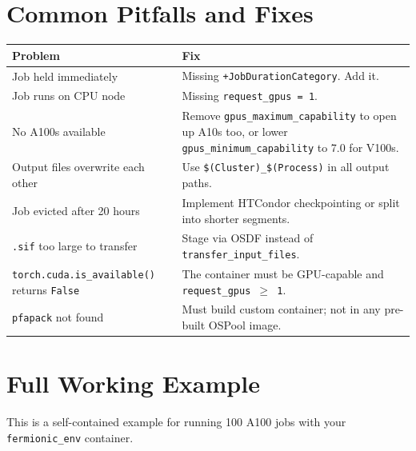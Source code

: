\documentclass[11pt]{article}
\begin{document}
\section{Common Pitfalls and Fixes}

\begin{center}
\begin{tabular}{p{}p{}}
\toprule
Problem & Fix \\
\midrule
Job held immediately & Missing \texttt{+JobDurationCategory}. Add it. \\
Job runs on CPU node & Missing \texttt{request\_gpus = 1}. \\
No A100s available & Remove \texttt{gpus\_maximum\_capability} to open up A10s too, or lower \texttt{gpus\_minimum\_capability} to 7.0 for V100s. \\
Output files overwrite each other & Use \texttt{\$(Cluster)\_\$(Process)} in all output paths. \\
Job evicted after 20 hours & Implement HTCondor checkpointing or split into shorter segments. \\
\texttt{.sif} too large to transfer & Stage via OSDF instead of \texttt{transfer\_input\_files}. \\
\texttt{torch.cuda.is\_available()} returns \texttt{False} & The container must be GPU-capable and \texttt{request\_gpus $\geq$ 1}. \\
\texttt{pfapack} not found & Must build custom container; not in any pre-built OSPool image. \\
\bottomrule
\end{tabular}
\end{center}

\section{Full Working Example}

This is a self-contained example for running 100 A100 jobs with your
\texttt{fermionic\_env} container.
\end{document}
